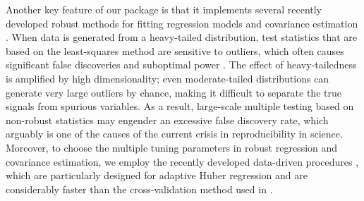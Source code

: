 Another key feature of our package is that it implements several recently developed robust methods for fitting regression models \citep{ZBFL2017, SZF2020} and covariance estimation \citep{KMRSZ2019}. When data is generated from a heavy-tailed distribution, test statistics that are based on the least-squares method are sensitive to outliers, which often causes significant false discoveries and suboptimal power \citep{ZBFL2017}. The effect of heavy-tailedness is amplified by high dimensionality; even moderate-tailed distributions can generate very large outliers by chance, making it difficult to separate the true signals from spurious variables. As a result, large-scale multiple testing based on non-robust statistics may engender an excessive false discovery rate, which arguably is one of the causes of the current crisis in reproducibility in science. Moreover, to choose the multiple tuning parameters in robust regression and covariance estimation,  we employ the recently developed data-driven procedures \citep{WZZZ2020,KMRSZ2019}, which are particularly designed for adaptive Huber regression and are considerably faster than the cross-validation method used in \cite{FKSZ2017}.






